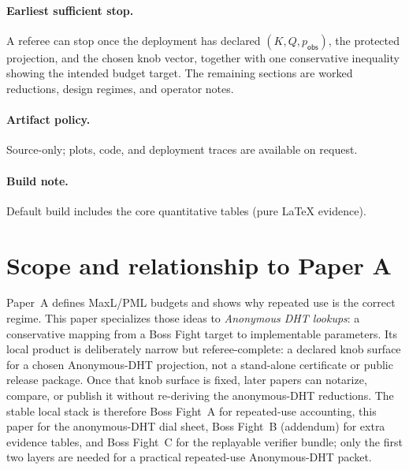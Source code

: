 \documentclass[11pt]{article}
\begin{document}
\paragraph{Earliest sufficient stop.}
A referee can stop once the deployment has declared $(K,Q,p_{\mathsf{obs}})$, the protected projection, and the chosen knob vector, together with one conservative inequality showing the intended budget target. The remaining sections are worked reductions, design regimes, and operator notes.

\paragraph{Artifact policy.}
Source-only; plots, code, and deployment traces are available on request.\cite{series:artifactpolicy}

\paragraph{Build note.}
Default build includes the core quantitative tables (pure \LaTeX{} evidence). 

\section{Scope and relationship to Paper A}\label{sec:scope}
Paper~A \cite{series:bossfightA} defines MaxL/PML budgets and shows why repeated use is the correct regime.
This paper specializes those ideas to \emph{Anonymous DHT lookups}:
a conservative mapping from a Boss Fight target to implementable parameters.
Its local product is deliberately narrow but referee-complete: a declared knob surface for a chosen Anonymous-DHT projection, not a stand-alone certificate or public release package.
Once that knob surface is fixed, later papers can notarize, compare, or publish it without re-deriving the anonymous-DHT reductions.
The stable local stack is therefore Boss Fight~A for repeated-use accounting, this paper for the anonymous-DHT dial sheet, Boss Fight~B (addendum) for extra evidence tables, and Boss Fight~C for the replayable verifier bundle; only the first two layers are needed for a practical repeated-use Anonymous-DHT packet.
\end{document}

